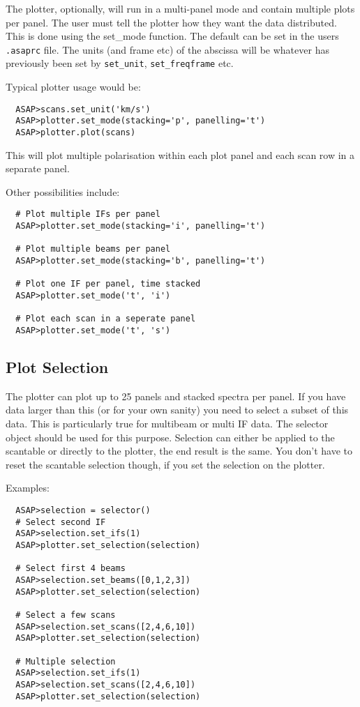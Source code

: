\documentclass[11pt]{article}
\newcommand{\cmd}[1]{{\tt #1}}
\begin{document}
The plotter, optionally, will run in a multi-panel mode and contain
multiple plots per panel. The user must tell the plotter how they want
the data distributed. This is done using the set\_mode function. The
default can be set in the users {\tt .asaprc} file. The units (and frame
etc) of the abscissa will be whatever has previously been set by
\cmd{set\_unit}, \cmd{set\_freqframe} etc.

Typical plotter usage would be:

\begin{verbatim}
  ASAP>scans.set_unit('km/s')
  ASAP>plotter.set_mode(stacking='p', panelling='t')
  ASAP>plotter.plot(scans)
\end{verbatim}

This will plot multiple polarisation within each plot panel and each
scan row in a separate panel.

Other possibilities include:

\begin{verbatim}
  # Plot multiple IFs per panel
  ASAP>plotter.set_mode(stacking='i', panelling='t')

  # Plot multiple beams per panel
  ASAP>plotter.set_mode(stacking='b', panelling='t')

  # Plot one IF per panel, time stacked
  ASAP>plotter.set_mode('t', 'i')

  # Plot each scan in a seperate panel
  ASAP>plotter.set_mode('t', 's')

\end{verbatim}

\subsection{Plot Selection}
\label{sec:plotter_cursor}

The plotter can plot up to 25 panels and
stacked spectra per panel. If you have data larger than this (or for
your own sanity) you need to select a subset of this data. This is
particularly true for multibeam or multi IF data. The selector object
should be used for this purpose. Selection can either be applied to
the scantable or directly to the plotter, the end result is the same.
You don't have to reset the scantable selection though, if you set
the selection on the plotter.

Examples:

\begin{verbatim}
  ASAP>selection = selector()
  # Select second IF
  ASAP>selection.set_ifs(1)
  ASAP>plotter.set_selection(selection)

  # Select first 4 beams
  ASAP>selection.set_beams([0,1,2,3])
  ASAP>plotter.set_selection(selection)

  # Select a few scans
  ASAP>selection.set_scans([2,4,6,10])
  ASAP>plotter.set_selection(selection)

  # Multiple selection
  ASAP>selection.set_ifs(1)
  ASAP>selection.set_scans([2,4,6,10])
  ASAP>plotter.set_selection(selection)

\end{verbatim}
\end{document}

